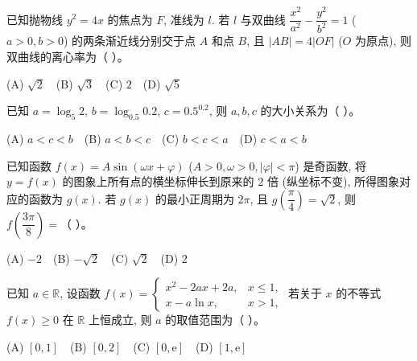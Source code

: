 \begin{question}
已知抛物线 $y^2 = 4x$ 的焦点为 $F$, 准线为 $l$. 若 $l$ 与双曲线 $\dfrac{x^2}{a^2} - \dfrac{y^2}{b^2} = 1$ ($a > 0, b > 0$) 的两条渐近线分别交于点 $A$ 和点 $B$, 且 $|AB| = 4|OF|$ ($O$ 为原点), 则双曲线的离心率为（ ）。

(A) $\sqrt{2}$　(B) $\sqrt{3}$　(C) $2$　(D) $\sqrt{5}$

\end{question}
\begin{question}
已知 $a = \log_5 2$, $b = \log_{0.5} 0.2$, $c = 0.5^{0.2}$, 则 $a, b, c$ 的大小关系为（ ）。

(A) $a < c < b$　(B) $a < b < c$　(C) $b < c < a$　(D) $c < a < b$

\end{question}
\begin{question}
已知函数 $f(x) = A \sin(\omega x + \varphi)$ ($A > 0, \omega > 0, |\varphi| < \pi$) 是奇函数, 将 $y = f(x)$ 的图象上所有点的横坐标伸长到原来的 $2$ 倍 (纵坐标不变), 所得图象对应的函数为 $g(x)$. 若 $g(x)$ 的最小正周期为 $2\pi$, 且 $g\left(\dfrac{\pi}{4}\right) = \sqrt{2}$, 则 $f\left(\dfrac{3\pi}{8}\right) =$（ ）。

(A) $-2$　(B) $-\sqrt{2}$　(C) $\sqrt{2}$　(D) $2$

\end{question}
\begin{question}
已知 $a \in \mathbb{R}$, 设函数 $f(x) = \begin{cases} x^2 - 2ax + 2a, & x \leqslant 1, \\ x - a \ln x, & x > 1, \end{cases}$ 若关于 $x$ 的不等式 $f(x) \geqslant 0$ 在 $\mathbb{R}$ 上恒成立, 则 $a$ 的取值范围为（ ）。

(A) $[0, 1]$　(B) $[0, 2]$　(C) $[0, \mathrm{e}]$　(D) $[1, \mathrm{e}]$

\par\medskip

\end{question}

